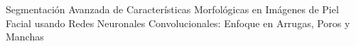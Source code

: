 \begin{center}
	\vspace*{10cm}
	{Segmentación Avanzada de Características Morfológicas en Imágenes de Piel Facial usando Redes Neuronales Convolucionales: Enfoque en Arrugas, Poros y Manchas}
\end{center}
